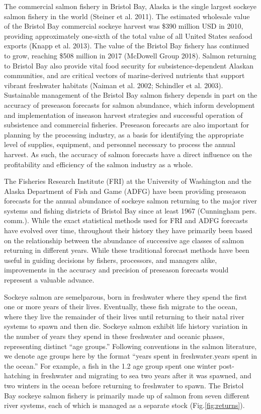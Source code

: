 \documentclass[
]{article}
\begin{document}
The commercial salmon fishery in Bristol Bay, Alaska is the single largest sockeye salmon fishery in the world (Steiner et al. 2011). The estimated wholesale value of the Bristol Bay commercial sockeye harvest was \$390 million USD in 2010, providing approximately one-sixth of the total value of all United States seafood exports (Knapp et al. 2013). The value of the Bristol Bay fishery has continued to grow, reaching \$508 million in 2017 (McDowell Group 2018). Salmon returning to Bristol Bay also provide vital food security for subsistence-dependent Alaskan communities, and are critical vectors of marine-derived nutrients that support vibrant freshwater habitats (Naiman et al. 2002; Schindler et al. 2003). Sustainable management of the Bristol Bay salmon fishery depends in part on the accuracy of preseason forecasts for salmon abundance, which inform development and implementation of inseason harvest strategies and successful operation of subsistence and commercial fisheries. Preseason forecasts are also important for planning by the processing industry, as a basis for identifying the appropriate level of supplies, equipment, and personnel necessary to process the annual harvest. As such, the accuracy of salmon forecasts have a direct influence on the profitability and efficiency of the salmon industry as a whole.

The Fisheries Research Institute (FRI) at the University of Washington and the Alaska Department of Fish and Game (ADFG) have been providing preseason forecasts for the annual abundance of sockeye salmon returning to the major river systems and fishing districts of Bristol Bay since at least 1967 (Cunningham pers. comm.). While the exact statistical methods used for FRI and ADFG forecasts have evolved over time, throughout their history they have primarily been based on the relationship between the abundance of successive age classes of salmon returning in different years. While these traditional forecast methods have been useful in guiding decisions by fishers, processors, and managers alike, improvements in the accuracy and precision of preseason forecasts would represent a valuable advance.

Sockeye salmon are semelparous, born in freshwater where they spend the first one or more years of their lives. Eventually, these fish migrate to the ocean, where they live the remainder of their lives until returning to their natal river systems to spawn and then die. Sockeye salmon exhibit life history variation in the number of years they spend in these freshwater and oceanic phases, representing distinct ``age groups.'' Following conventions in the salmon literature, we denote age groups here by the format ``years spent in freshwater.years spent in the ocean.'' For example, a fish in the 1.2 age group spent one winter post-hatching in freshwater and migrating to sea two years after it was spawned, and two winters in the ocean before returning to freshwater to spawn. The Bristol Bay sockeye salmon fishery is primarily made up of salmon from seven different river systems, each of which is managed as a separate stock (Fig.\ref{fig:returns}).
\end{document}
